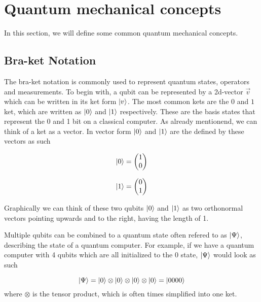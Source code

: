 \section{Quantum mechanical concepts}
In this section, we will define some common quantum mechanical concepts. 


\subsection{Bra-ket Notation}
The bra-ket notation is commonly used to represent quantum states, operators and measurements.
To begin with, a qubit can be represented by a 2d-vector $\vec v$ which can be written in its ket form $\ket v$.
The most common kets are the $0$ and $1$ ket, which are written as $\ket 0$ and $\ket 1$ respectively.
These are the basis states that represent the 0 and 1 bit on a classical computer. 
As already mentionend, we can think of a ket as a vector. 
In vector form $\ket 0$ and $\ket 1$ are the defined by these vectors as such

\begin{equation}
  \ket 0  = \begin{pmatrix}1\\0\end{pmatrix} 
\end{equation}

\begin{equation}
  \ket 1  = \begin{pmatrix}0\\1\end{pmatrix}
\end{equation}

Graphically we can think of these two qubits $\ket 0$ and $\ket 1$ as two orthonormal vectors pointing upwards and to the right, having the length of 1.

Multiple qubits can be combined to a quantum state often refered to as $\ket \Psi$, describing the state of a quantum computer. 
For example, if we have a quantum computer with 4 qubits which are all initialized to the 0 state, $\ket \Psi$ would look as such

\begin{equation}
    \ket \Psi = \ket 0 \otimes \ket 0 \otimes \ket 0 \otimes \ket 0 = \ket{0000}
\end{equation}
where $\otimes$ is the tensor product, which is often times simplified into one ket.

